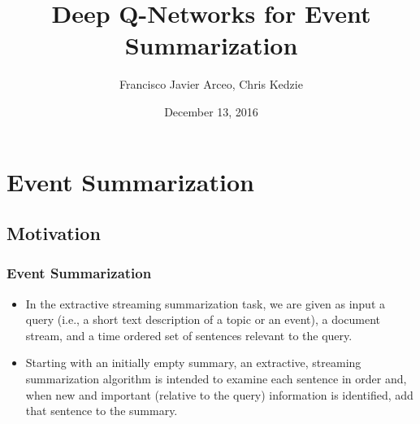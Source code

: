 \documentclass[]{beamer}
\begin{document}
\title{Deep Q-Networks for Event Summarization}  
\author{Francisco Javier Arceo, Chris Kedzie}
\date{December 13, 2016}



\begin{frame}
\titlepage
\end{frame}

\begin{frame}
	\tableofcontents
\end{frame}


\section{Event Summarization}
	\subsection{Motivation}
\begin{frame}
	\frametitle{Event Summarization} 
	\begin{itemize}
	\item<1-> 	In the extractive streaming summarization task, we are given as input a query (i.e., a short text description of a topic or an event), a document stream, and a time ordered set of sentences relevant to the query. 
	
	\item<1-> Starting with an initially empty summary,  an extractive, streaming summarization algorithm is intended to examine each sentence in order and, when new and important (relative to the query) information is identified, add that sentence to the summary. 
	\end{itemize}
\end{frame}
\end{document}
